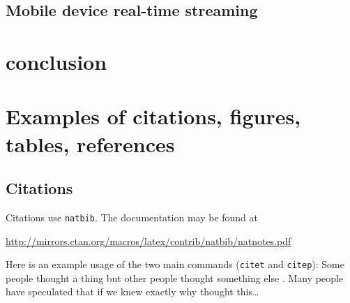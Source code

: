 \documentclass{article}
\begin{document}
\subsection{Mobile device real-time streaming}


\section{conclusion}





\section{Examples of citations, figures, tables, references}
\label{sec:others}

\subsection{Citations}
Citations use \verb+natbib+. The documentation may be found at
\begin{center}
	\url{http://mirrors.ctan.org/macros/latex/contrib/natbib/natnotes.pdf}
\end{center}

Here is an example usage of the two main commands (\verb+citet+ and \verb+citep+): Some people thought a thing \citep{kour2014real, hadash2018estimate} but other people thought something else \citep{kour2014fast}. Many people have speculated that if we knew exactly why \citet{kour2014fast} thought this\dots
\end{document}
